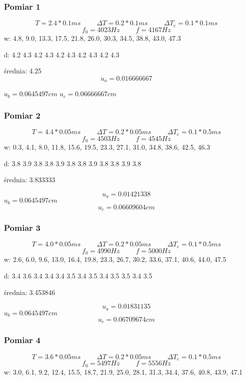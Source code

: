 \documentclass[12pt,a4paper]{article}
\begin{document}
\subsubsection{Pomiar 1}
$$
T = 2.4*0.1ms \hspace{1cm} \Delta T = 0.2*0.1ms \hspace{1cm} \Delta T_e = 0.1*0.1ms 
$$
$$
f_0 = 4023Hz \hspace{1cm} f=4167Hz
$$
w: 4.8, 9.0, 13.3, 17.5, 21.8, 26.0, 30.3, 34.5, 38.8, 43.0, 47.3

d: 4.2 4.3 4.2 4.3 4.2 4.3 4.2 4.3 4.2 4.3

średnia: 4.25
$$
u_a = 0.016666667
$$

$u_b = 0.0645497cm $
$u_c = 0.06666667cm $
\subsubsection{Pomiar 2}
$$
T = 4.4*0.05ms \hspace{1cm} \Delta T = 0.2*0.05ms \hspace{1cm} \Delta T_e = 0.1*0.5ms 
$$
$$
f_0 = 4503 Hz \hspace{1cm} f=4545Hz
$$
w: 0.3, 4.1, 8.0, 11.8, 15.6, 19.5, 23.3, 27.1, 31.0, 34.8, 38.6, 42.5, 46.3

d: 3.8 3.9 3.8 3.8 3.9 3.8 3.8 3.9 3.8 3.8 3.9 3.8

średnia: 3.833333

$$
u_a = 0.01421338
$$
$u_b = 0.0645497cm $
$$u_c = 0.06609604cm $$
\subsubsection{Pomiar 3}
$$
T = 4.0*0.05ms \hspace{1cm} \Delta T = 0.2*0.05ms \hspace{1cm} \Delta T_e = 0.1*0.5ms 
$$
$$
f_0 = 4990 Hz \hspace{1cm} f=5000Hz
$$
w: 2.6, 6.0, 9.6, 13.0, 16.4, 19.8, 23.3, 26.7, 30.2, 33.6, 37.1, 40.6, 44.0, 47.5

d: 3.4 3.6 3.4 3.4 3.4 3.5 3.4 3.5 3.4 3.5 3.5 3.4 3.5

średnia: 3.453846

$$
u_a = 0.01831135
$$
$u_b = 0.0645497cm $
$$u_c = 0.06709674cm $$
\subsubsection{Pomiar 4}
$$
T = 3.6*0.05ms \hspace{1cm} \Delta T = 0.2*0.05ms \hspace{1cm} \Delta T_e = 0.1*0.5ms 
$$
$$
f_0 = 5497 Hz \hspace{1cm} f=5556Hz
$$
w: 3.0, 6.1, 9.2, 12.4, 15.5, 18.7, 21.9, 25.0, 28.1, 31.3, 34.4, 37.6, 40.8, 43.9, 47.1
\end{document}
